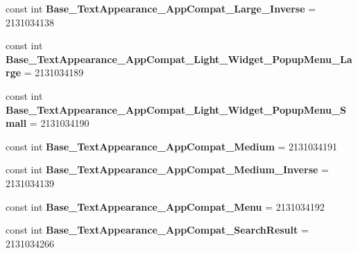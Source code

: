 \begin{DoxyCompactItemize}
\item 
\hypertarget{classClient_1_1Droid_1_1Resource_1_1Style_affd257f10a98731cfa12db8a5e474ec0}{}const int {\bfseries Base\+\_\+\+Text\+Appearance\+\_\+\+App\+Compat\+\_\+\+Large\+\_\+\+Inverse} = 2131034138\label{classClient_1_1Droid_1_1Resource_1_1Style_affd257f10a98731cfa12db8a5e474ec0}

\item 
\hypertarget{classClient_1_1Droid_1_1Resource_1_1Style_afd98af2b7404b89365c9e2c8534042a7}{}const int {\bfseries Base\+\_\+\+Text\+Appearance\+\_\+\+App\+Compat\+\_\+\+Light\+\_\+\+Widget\+\_\+\+Popup\+Menu\+\_\+\+Large} = 2131034189\label{classClient_1_1Droid_1_1Resource_1_1Style_afd98af2b7404b89365c9e2c8534042a7}

\item 
\hypertarget{classClient_1_1Droid_1_1Resource_1_1Style_a475f9632c9c5c2a7e48250757a54541c}{}const int {\bfseries Base\+\_\+\+Text\+Appearance\+\_\+\+App\+Compat\+\_\+\+Light\+\_\+\+Widget\+\_\+\+Popup\+Menu\+\_\+\+Small} = 2131034190\label{classClient_1_1Droid_1_1Resource_1_1Style_a475f9632c9c5c2a7e48250757a54541c}

\item 
\hypertarget{classClient_1_1Droid_1_1Resource_1_1Style_adc6c0f8ac24da0179f29053f84e00100}{}const int {\bfseries Base\+\_\+\+Text\+Appearance\+\_\+\+App\+Compat\+\_\+\+Medium} = 2131034191\label{classClient_1_1Droid_1_1Resource_1_1Style_adc6c0f8ac24da0179f29053f84e00100}

\item 
\hypertarget{classClient_1_1Droid_1_1Resource_1_1Style_abf445756e1cec1601bd07c6edd32f396}{}const int {\bfseries Base\+\_\+\+Text\+Appearance\+\_\+\+App\+Compat\+\_\+\+Medium\+\_\+\+Inverse} = 2131034139\label{classClient_1_1Droid_1_1Resource_1_1Style_abf445756e1cec1601bd07c6edd32f396}

\item 
\hypertarget{classClient_1_1Droid_1_1Resource_1_1Style_afb6e3beded7ac2687f1c166c1d75b2c6}{}const int {\bfseries Base\+\_\+\+Text\+Appearance\+\_\+\+App\+Compat\+\_\+\+Menu} = 2131034192\label{classClient_1_1Droid_1_1Resource_1_1Style_afb6e3beded7ac2687f1c166c1d75b2c6}

\item 
\hypertarget{classClient_1_1Droid_1_1Resource_1_1Style_a0641a2101ea14638291fdab17858ea1f}{}const int {\bfseries Base\+\_\+\+Text\+Appearance\+\_\+\+App\+Compat\+\_\+\+Search\+Result} = 2131034266\label{classClient_1_1Droid_1_1Resource_1_1Style_a0641a2101ea14638291fdab17858ea1f}


\end{DoxyCompactItemize}
